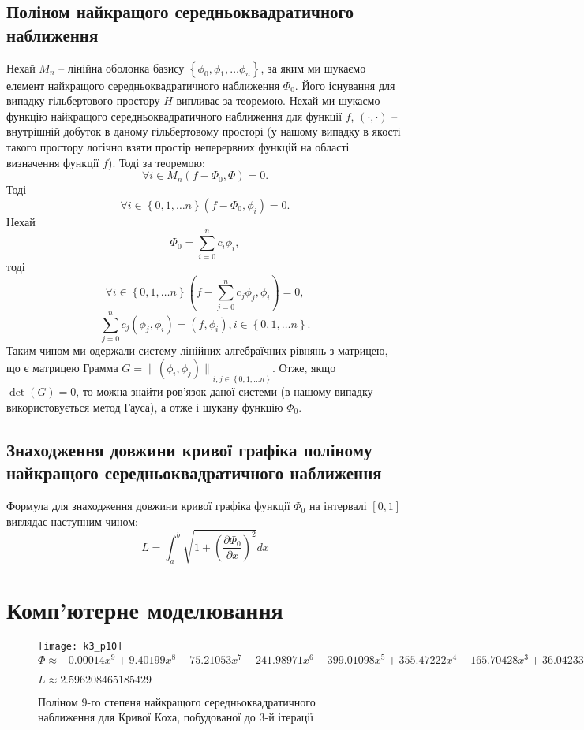 \documentclass[12pt,a4paper]{article}
\begin{document}
	\subsection{Поліном найкращого середньоквадратичного наближення}
	Нехай $M_n$ – лінійна оболонка базису $\left\{ \phi_0, \phi_1, \dots \phi_n\right\}$, за яким ми шукаємо елемент найкращого середньоквадратичного наближення $\Phi_0$. Його існування для випадку гільбертового простору $H$ випливає за теоремою. Нехай ми шукаємо функцію найкращого середньоквадратичного наближення для функції $f$, $\left( \cdot, \cdot \right)$ – внутрішній добуток в даному гільбертовому просторі (у нашому випадку в якості такого простору логічно взяти простір неперервних функцій на області визначення функції $f$). Тоді за теоремою: $$\forall i \in M_n \left( f-\Phi_0, \Phi\right)=0.$$ Тоді $$\forall i \in \left\{ 0, 1, \dots n\right\} \left( f-\Phi_0, \phi_i\right)=0.$$ Нехай $$\Phi_0 = \sum_{i=0}^n {c_i \phi_i},$$ тоді $$\forall i \in \left\{ 0, 1, \dots n\right\} \left( f-\sum_{j=0}^n c_j \phi_j, \phi_i \right) = 0,$$ $$\sum_{j=0}^n {c_j \left(\phi_j, \phi_i \right)} = \left(f, \phi_i \right), i \in \left\{ 0, 1, \dots n \right\}.$$ Таким чином ми одержали систему лінійних алгебраїчних рівнянь з матрицею, що є матрицею Грамма $G = {\|\left(\phi_i, \phi_j \right)\|}_{i, j \in \left\{ 0, 1, \dots n\right\}}.$ Отже, якщо $\det\left(G\right) = 0$, то можна знайти ров'язок даної системи (в нашому випадку використовується метод Гауса), а отже і шукану функцію $\Phi_0$.
	
	\subsection{Знаходження довжини кривої графіка поліному найкращого середньоквадратичного наближення}
	Формула для знаходження довжини кривої графіка функції $\Phi_0$ на інтервалі $[0, 1]$ виглядає наступним чином: $$L = \int_a^b \sqrt{1 + \left( \frac{\partial \Phi_0}{\partial x} \right)^2}dx$$
	
	
\section{Комп’ютерне моделювання}

\begin{figure}[!ht]
	\caption{Поліном 9-го степеня найкращого середньоквадратичного наближення для Кривої Коха, побудованої до 3-й ітерації}
	\centering
   	\texttt{[image: k3\_p10]}
	$\Phi \approx -0.00014x^9 +9.40199x^8 -75.21053x^7 +241.98971x^6 -399.01098x^5 +355.47222x^4 -165.70428x^3 +36.04233x^2 -2.48501x^1 +0.01602x^0 $ \par	
	$L  \approx 2.596208465185429$
\end{figure}	
\end{document}
